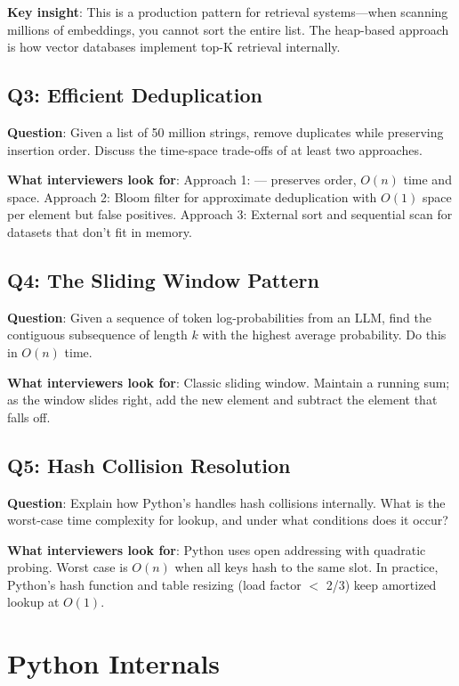 \textbf{Key insight}: This is a production pattern for retrieval systems---when scanning millions of embeddings, you cannot sort the entire list. The heap-based approach is how vector databases implement top-K retrieval internally.

\subsection{Q3: Efficient Deduplication}

\textbf{Question}: Given a list of 50 million strings, remove duplicates while preserving insertion order. Discuss the time-space trade-offs of at least two approaches.

\textbf{What interviewers look for}: Approach 1:  --- preserves order, $O(n)$ time and space. Approach 2: Bloom filter for approximate deduplication with $O(1)$ space per element but false positives. Approach 3: External sort and sequential scan for datasets that don't fit in memory.

\subsection{Q4: The Sliding Window Pattern}

\textbf{Question}: Given a sequence of token log-probabilities from an LLM, find the contiguous subsequence of length $k$ with the highest average probability. Do this in $O(n)$ time.

\textbf{What interviewers look for}: Classic sliding window. Maintain a running sum; as the window slides right, add the new element and subtract the element that falls off.

\subsection{Q5: Hash Collision Resolution}

\textbf{Question}: Explain how Python's  handles hash collisions internally. What is the worst-case time complexity for lookup, and under what conditions does it occur?

\textbf{What interviewers look for}: Python uses open addressing with quadratic probing. Worst case is $O(n)$ when all keys hash to the same slot. In practice, Python's hash function and table resizing (load factor $<$ 2/3) keep amortized lookup at $O(1)$.


\section{Python Internals}

